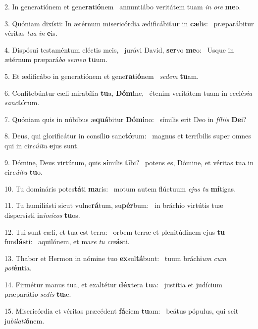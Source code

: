 2. In generatiónem et gene\textbf{ra}ti\textbf{ó}nem \ast\  annuntiábo veritátem tuam \textit{in} \textit{o}\textit{re} \textbf{me}o.\

3. Quóniam dixísti: In ætérnum misericórdia ædificábi\textbf{tur} in \textbf{cæ}lis: \ast\  præparábitur véritas \textit{tu}\textit{a} \textit{in} \textbf{e}is.\

4. Dispósui testaméntum eléctis meis, \dag\  jurávi David, \textbf{ser}vo \textbf{me}o: \ast\  Usque in ætérnum præpará\textit{bo} \textit{se}\textit{men} \textbf{tu}um.\

5. Et ædificábo in generatiónem et gene\textbf{ra}ti\textbf{ó}nem \ast\  \textit{se}\textit{dem} \textbf{tu}am.\

6. Confitebúntur cæli mirabília \textbf{tu}a, \textbf{Dó}\textbf{mi}ne, \ast\  étenim veritátem tuam in ecclé\textit{si}\textit{a} \textit{sanc}\textbf{tó}rum.\

7. Quóniam quis in núbibus æ\textbf{quá}bitur \textbf{Dó}\textbf{mi}no: \ast\  símilis erit Deo in \textit{fí}\textit{li}\textit{is} \textbf{De}i?\

8. Deus, qui glorificátur in consíli\textbf{o} sanc\textbf{tó}rum: \ast\  magnus et terríbilis super omnes qui in cir\textit{cú}\textit{i}\textit{tu} \textbf{e}jus sunt.\

9. Dómine, Deus virtútum, quis \textbf{sí}milis \textbf{ti}bi? \ast\  potens es, Dómine, et véritas tua in cir\textit{cú}\textit{i}\textit{tu} \textbf{tu}o.\

10. Tu domináris potes\textbf{tá}ti \textbf{ma}ris: \ast\  motum autem flúctuum \textit{e}\textit{jus} \textit{tu} \textbf{mí}tigas.\

11. Tu humiliásti sicut vulne\textbf{rá}tum, su\textbf{pér}bum: \ast\  in bráchio virtútis tuæ dispersísti in\textit{i}\textit{mí}\textit{cos} \textbf{tu}os.\

12. Tui sunt cæli, et tua est terra: \dag\  orbem terræ et plenitúdinem ejus \textbf{tu} fun\textbf{dás}ti: \ast\  aquilónem, et ma\textit{re} \textit{tu} \textit{cre}\textbf{ás}ti.\

13. Thabor et Hermon in nómine tuo \textbf{ex}sul\textbf{tá}bunt: \ast\  tuum bráchi\textit{um} \textit{cum} \textit{pot}\textbf{én}tia.\

14. Firmétur manus tua, et exaltétur \textbf{déx}tera \textbf{tu}a: \ast\  justítia et judícium præparáti\textit{o} \textit{se}\textit{dis} \textbf{tu}æ.\

15. Misericórdia et véritas præcédent \textbf{fá}ciem \textbf{tu}am: \ast\  beátus pópulus, qui scit ju\textit{bi}\textit{la}\textit{ti}\textbf{ó}nem.\

